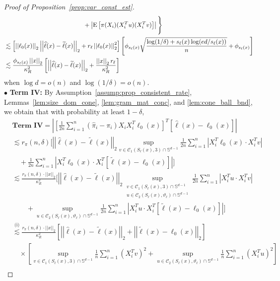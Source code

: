 \documentclass[ejsv2,noshowframe]{imsart}
\theoremstyle{plain}
\theoremstyle{definition}
\theoremstyle{remark}
\newcommand{\norm}[1]{\left|\left| #1 \right|\right|}
\renewcommand{\hat}{\widehat}
\renewcommand{\tilde}{\widetilde}
\begin{document}
\begin{proof}[Proof of Proposition~\ref{prop:var_const_est}]
\begin{align*}
		&\hspace{45mm} + \left|\mathrm{E}\left[\pi(X_i) (X_i^Tu) (X_i^Tv)\right]\right| \Bigg\}\\
		&\lesssim \left[\norm{\ell_0(x)}_2 \norm{\hat{\ell}(x) -\tilde{\ell}(x)}_2 + r_{\ell} \norm{\ell_0(x)}_2^2 \right]\left[\phi_{s_{\ell}(x)}\sqrt{\frac{\log(1/\delta)+s_{\ell}(x)\log(ed/s_{\ell}(x))}{n}} + \phi_{s_{\ell}(x)} \right]\\
		&\lesssim \frac{\phi_{s_{\ell}(x)} \norm{x}_2}{\kappa_R^2} \left[\norm{\hat{\ell}(x) -\tilde{\ell}(x)}_2 + \frac{\norm{x}_2 r_{\ell}}{\kappa_R^2} \right]
	\end{align*}
	when $\log d=o(n)$ and $\log(1/\delta)=o(n)$. \\
	
	
	\noindent$\bullet$ \textbf{Term IV:} By Assumption~\ref{assump:prop_consistent_rate}, Lemmas~\ref{lem:size_dom_cone}, \ref{lem:gram_mat_conc}, and \ref{lem:cone_ball_bnd}, we obtain that with probability at least $1-\delta$,
	\begin{align*}
		&\textbf{Term IV} = \left|\left[\frac{1}{2n}\sum_{i=1}^n \left(\hat{\pi}_i -\pi_i\right) X_iX_i^T \ell_0(x)\right]^T \left[\hat{\ell}(x)-\ell_0(x) \right] \right|\\
		&\lesssim r_{\pi}(n,\delta)\Biggl[\norm{\hat{\ell}(x) -\tilde{\ell}(x)}_2 \sup_{v \in \mathcal{C}_1(S_{\ell}(x),3)\cap \mathbb{S}^{d-1}} \frac{1}{2n}\sum_{i=1}^n \left|X_i^T\ell_0(x) \cdot X_i^Tv\right| \\
		&\quad + \frac{1}{2n}\sum_{i=1}^n \left|X_i^T\ell_0(x) \cdot X_i^T\left[\tilde{\ell}(x) -\ell_0(x)\right]\right| \Biggr]\\
		&\lesssim \frac{r_{\pi}(n,\delta) \cdot \norm{x}_2}{\kappa_R^2} \Biggl[\norm{\hat{\ell}(x) -\tilde{\ell}(x)}_2 \sup_{\substack{v \in \mathcal{C}_1(S_{\ell}(x),3) \cap \mathbb{S}^{d-1}\\ u\in \mathcal{C}_2(S_{\ell}(x),\vartheta_{\ell})\cap \mathbb{S}^{d-1}}} \frac{1}{2n}\sum_{i=1}^n \left|X_i^Tu \cdot X_i^Tv\right| \\
		&\quad\quad + \sup_{u \in \mathcal{C}_2(S_{\ell}(x),\vartheta_{\ell})\cap \mathbb{S}^{d-1}} \frac{1}{2n}\sum_{i=1}^n \left|X_i^Tu \cdot X_i^T\left[\tilde{\ell}(x) -\ell_0(x)\right]\right| \Biggr]\\
		&\stackrel{\text{(i)}}{\lesssim} \frac{r_{\pi}(n,\delta) \cdot \norm{x}_2}{\kappa_R^2} \left[\norm{\hat{\ell}(x) -\tilde{\ell}(x)}_2 + \norm{\tilde{\ell}(x) -\ell_0(x)}_2 \right]\\
		&\quad \times  \left[\sup_{v \in \mathcal{C}_1(S_{\ell}(x),3) \cap \mathbb{S}^{d-1}} \frac{1}{n}\sum_{i=1}^n \left(X_i^Tv \right)^2 + \sup_{u\in \mathcal{C}_2(S_{\ell}(x),\vartheta_{\ell})\cap \mathbb{S}^{d-1}} \frac{1}{n}\sum_{i=1}^n \left(X_i^Tu\right)^2 \right] \\

\end{align*}
\end{proof}
\end{document}

